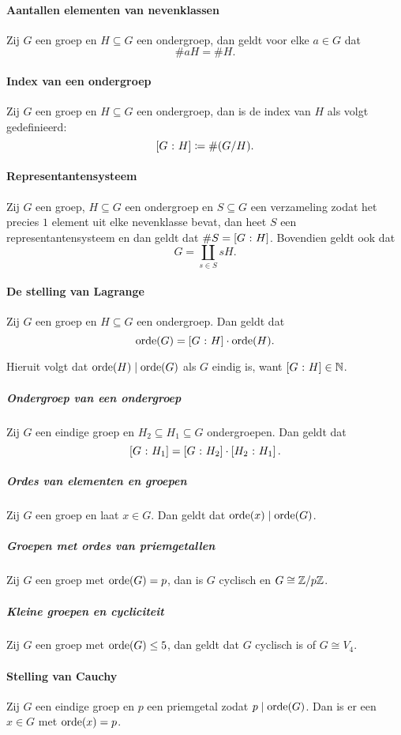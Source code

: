 \paragraph{Aantallen elementen van nevenklassen} Zij \(G\) een groep en \(H\subseteq G\) een ondergroep, dan geldt voor elke \(a\in G\) dat
\[
    \#aH=\#H.
\]

\paragraph{Index van een ondergroep} Zij \(G\) een groep en \(H\subseteq G\) een ondergroep, dan is de index van \(H\) als volgt gedefinieerd:
\[
    \left[G\>\colon H\right]\coloneqq \#(G/H).
\]

\paragraph{Representantensysteem} Zij \(G\) een groep, \(H\subseteq G\) een ondergroep en \(S\subseteq G\) een verzameling zodat het precies \(1\) element uit elke nevenklasse bevat, dan heet \(S\) een representantensysteem en dan geldt dat \(\#S=\left[G\>\colon H\right]\). Bovendien geldt ook dat
\[
    G=\coprod_{s\in S}sH.
\]

\paragraph{De stelling van Lagrange} Zij \(G\) een groep en \(H\subseteq G\) een ondergroep. Dan geldt dat
\[
    \operatorname{orde}(G)=\left[G\>\colon H\right]\cdot\operatorname{orde}(H).
\]

Hieruit volgt dat \(\operatorname{orde}(H)\mid\operatorname{orde}(G)\) als \(G\) eindig is, want \(\left[G\>\colon H\right]\in\mathbb{N}\).

\subparagraph{Ondergroep van een ondergroep} Zij \(G\) een eindige groep en \(H_{2}\subseteq H_{1}\subseteq G\) ondergroepen. Dan geldt dat
\[
    \left[G\>\colon H_{1}\right]=\left[G\>\colon H_{2}\right]\cdot\left[H_{2}\>\colon H_{1}\right].
\]

\subparagraph{Ordes van elementen en groepen} Zij \(G\) een groep en laat \(x\in G\). Dan geldt dat \(\operatorname{orde}(x)\mid\operatorname{orde}(G)\).

\subparagraph{Groepen met ordes van priemgetallen} Zij \(G\) een groep met \(\operatorname{orde}(G)=p\), dan is \(G\) cyclisch en \(G\cong\mathbb{Z}/p\mathbb{Z}\).

\subparagraph{Kleine groepen en cycliciteit} Zij \(G\) een groep met \(\operatorname{orde}(G)\leq5\), dan geldt dat \(G\) cyclisch is of \(G\cong V_{4}\).

\paragraph{Stelling van Cauchy} Zij \(G\) een eindige groep en \(p\) een priemgetal zodat \(p\mid\operatorname{orde}(G)\). Dan is er een \(x\in G\) met \(\operatorname{orde}(x)=p\).